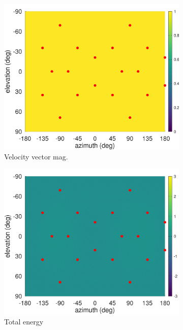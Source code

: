 \documentclass[12pt]{report}
\begin{document}
\begin{figure}[tbp]
  \hfill
    \begin{subfigure}{0.3\textwidth}
    \includegraphics[width=\linewidth]{figures/rV_dodeca.png}
    \caption{\centering Velocity vector mag.}
  \end{subfigure}
  \newline
    \begin{subfigure}{0.3\textwidth}
    \includegraphics[width=\linewidth]{figures/E_dodeca.png}
    \caption{\centering Total energy}
  \end{subfigure}
  \hfill
    \begin{subfigure}{0.3\textwidth}

\end{subfigure}
\end{figure}
\end{document}
